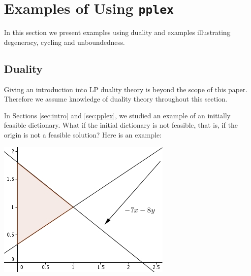 \documentclass[ukenglish,a4]{article}
\begin{document}
\section{Examples of Using \texttt{pplex}}\label{sec:examples}
In this section we present examples using duality and examples illustrating
degeneracy, cycling and unboundedness.

\subsection{Duality}

Giving an introduction into LP duality theory is beyond the scope of this paper. 
Therefore we assume knowledge of duality theory throughout this section.

In Sections \ref{sec:intro} and \ref{sec:pplex}, we studied an example of an initially feasible dictionary.
What if the initial dictionary is not feasible, that is, if the origin is not a
feasible solution? Here is an example:

\begin{minipage}{.45\textwidth}
\begin{alltt}

\end{alltt}
\end{minipage}
\begin{minipage}{.45\textwidth}
	\includegraphics{ex_dual.jpg}
\end{minipage}
\vspace{.2cm}
\end{document}
